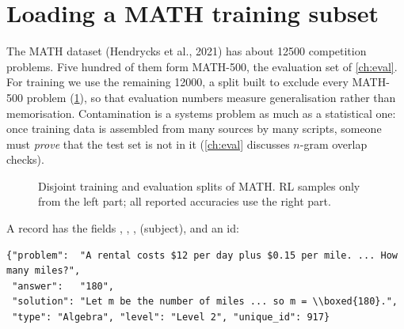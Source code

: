 \section{Loading a MATH training subset}\label{sec:grpo:data}

The MATH dataset (Hendrycks et al., 2021) has about \num{12500} competition problems.
Five hundred of them form MATH-500, the evaluation set of \cref{ch:eval}. For training we
use the remaining \num{12000}, a split built to exclude every MATH-500 problem
(\cref{fig:grpo:split}), so that evaluation numbers measure generalisation rather than
memorisation. Contamination is a systems problem as much as a statistical one: once
training data is assembled from many sources by many scripts, someone must
\emph{prove} that the test set is not in it (\cref{ch:eval} discusses $n$-gram overlap
checks).

\begin{figure}[ht]
\centering
{}
\caption{Disjoint training and evaluation splits of MATH. RL samples only from the left
part; all reported accuracies use the right part.}
\label{fig:grpo:split}
\end{figure}

A record has the fields , , , 
(subject),  and an id:

\begin{lstlisting}[style=plain,caption={Shape of one training record (contents abbreviated).},label={lst:grpo:record}]
{"problem":  "A rental costs $12 per day plus $0.15 per mile. ... How many miles?",
 "answer":   "180",
 "solution": "Let m be the number of miles ... so m = \\boxed{180}.",
 "type": "Algebra", "level": "Level 2", "unique_id": 917}
\end{lstlisting}

